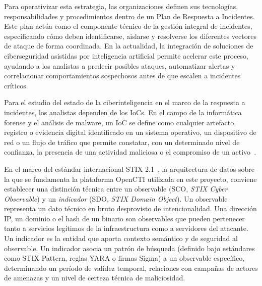\documentclass[12pt]{report}
\begin{document}
Para operativizar esta estrategia, las organizaciones definen sus tecnologías, responsabilidades y procedimientos dentro de un Plan de Respuesta a Incidentes. Este plan actúa como el componente técnico de la gestión integral de incidentes, especificando cómo deben identificarse, aislarse y resolverse los diferentes vectores de ataque de forma coordinada. En la actualidad, la integración de soluciones de ciberseguridad asistidas por inteligencia artificial permite acelerar este proceso, ayudando a los analistas a predecir posibles ataques, automatizar alertas y correlacionar comportamientos sospechosos antes de que escalen a incidentes críticos.

Para el estudio del estado de la ciberinteligencia en el marco de la respuesta a incidentes, los analistas dependen de los IoCs. En el campo de la informática forense y el análisis de malware, un IoC se define como cualquier artefacto, registro o evidencia digital identificado en un sistema operativo, un dispositivo de red o un flujo de tráfico que permite constatar, con un determinado nivel de confianza, la presencia de una actividad maliciosa o el compromiso de un activo~\cite{oasis2021stix}. 

En el marco del estándar internacional STIX 2.1~\cite{oasis2021stix}, la arquitectura de datos sobre la que se fundamenta la plataforma OpenCTI utilizada en este proyecto, conviene establecer una distinción técnica entre un observable (SCO, \textit{STIX Cyber Observable}) y un \textit{indicador} (SDO, \textit{STIX Domain Object}). Un observable representa un dato técnico en bruto desprovisto de intencionalidad. Una dirección IP, un dominio o el hash de un binario son observables que pueden pertenecer tanto a servicios legítimos de la infraestructura como a servidores del atacante. Un indicador es la entidad que aporta contexto semántico y de seguridad al observable. Un indicador asocia un patrón de búsqueda (definido bajo estándares como STIX Pattern, reglas YARA o firmas Sigma) a un observable específico, determinando un período de validez temporal, relaciones con campañas de actores de amenazas y un nivel de certeza técnica de maliciosidad.
\end{document}
